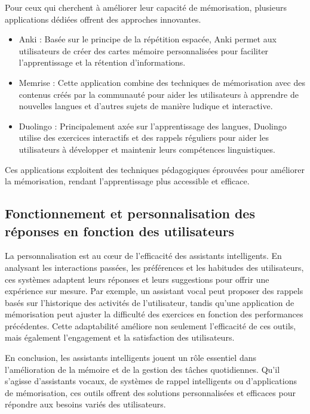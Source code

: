 \documentclass[12pt,a4paper]{report}
\begin{document}
Pour ceux qui cherchent à améliorer leur capacité de mémorisation, plusieurs applications dédiées offrent des approches innovantes.

\begin{itemize}
    \item Anki : Basée sur le principe de la répétition espacée, Anki permet aux utilisateurs de créer des cartes mémoire personnalisées pour faciliter l'apprentissage et la rétention d'informations.
    \item Memrise : Cette application combine des techniques de mémorisation avec des contenus créés par la communauté pour aider les utilisateurs à apprendre de nouvelles langues et d'autres sujets de manière ludique et interactive.
    \item Duolingo : Principalement axée sur l'apprentissage des langues, Duolingo utilise des exercices interactifs et des rappels réguliers pour aider les utilisateurs à développer et maintenir leurs compétences linguistiques.
\end{itemize}

Ces applications exploitent des techniques pédagogiques éprouvées pour améliorer la mémorisation, rendant l'apprentissage plus accessible et efficace.

\subsection{Fonctionnement et personnalisation des réponses en fonction des utilisateurs}

La personnalisation est au cœur de l'efficacité des assistants intelligents. En analysant les interactions passées, les préférences et les habitudes des utilisateurs, ces systèmes adaptent leurs réponses et leurs suggestions pour offrir une expérience sur mesure. Par exemple, un assistant vocal peut proposer des rappels basés sur l'historique des activités de l'utilisateur, tandis qu'une application de mémorisation peut ajuster la difficulté des exercices en fonction des performances précédentes. Cette adaptabilité améliore non seulement l'efficacité de ces outils, mais également l'engagement et la satisfaction des utilisateurs.

En conclusion, les assistants intelligents jouent un rôle essentiel dans l'amélioration de la mémoire et de la gestion des tâches quotidiennes. Qu'il s'agisse d'assistants vocaux, de systèmes de rappel intelligents ou d'applications de mémorisation, ces outils offrent des solutions personnalisées et efficaces pour répondre aux besoins variés des utilisateurs.
\end{document}

